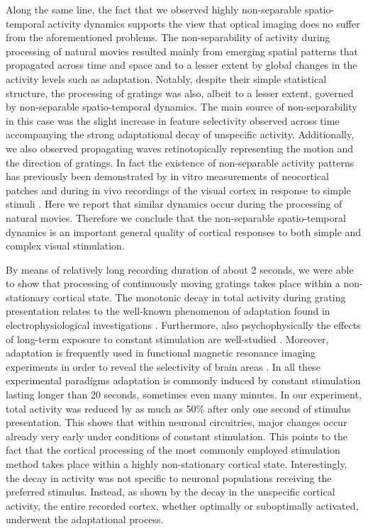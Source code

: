 Along the same line, the fact that we observed highly non-separable
spatio-temporal activity dynamics supports the view that optical imaging
does no suffer from the aforementioned problems. The non-separability of
activity during processing of natural movies resulted mainly from emerging
spatial patterns that propagated across time and space and to a lesser
extent by global changes in the activity levels such as adaptation.
Notably, despite their simple statistical structure, the processing of
gratings was also, albeit to a lesser extent, governed by non-separable
spatio-temporal dynamics. The main source of non-separability in this case
was the slight increase in feature selectivity observed across time
accompanying the strong adaptational decay of unspecific activity.
Additionally, we also observed propagating waves retinotopically
representing the motion and the direction of gratings. In fact the
existence of non-separable activity patterns has previously been
demonstrated by in vitro measurements of neocortical patches
\citep{xu2007a} and during in vivo recordings of the visual cortex in
response to simple stimuli \citep{prechtl1997a,benucci2007a}. Here we
report that similar dynamics occur during the processing of natural movies.
Therefore we conclude that the non-separable spatio-temporal dynamics is an
important general quality of cortical responses to both simple and complex
visual stimulation.

By means of relatively long recording duration of about 2 seconds, we were
able to show that processing of continuously moving gratings takes place
within a non-stationary cortical state. The monotonic decay in total
activity during grating presentation relates to the well-known phenomenon
of adaptation found in electrophysiological investigations
\citep{maffei1973a, vautin1977a, movshon1979a, ohzawa1982a, kohn2003a}.
Furthermore, also psychophysically the effects of long-term exposure to
constant stimulation are well-studied \citep{gibson1937a, blakemore1969a,
pestilli2007a}. Moreover, adaptation is frequently used in functional
magnetic resonance imaging experiments in order to reveal the selectivity
of brain areas \citep{krekelberg2006a}. In all these experimental paradigms
adaptation is commonly induced by constant stimulation lasting longer than
20 seconds, sometimes even many minutes. In our experiment, total activity
was reduced by as much as 50\% after only one second of stimulus
presentation. This shows that within neuronal circuitries, major changes
occur already very early under conditions of constant stimulation. This
points to the fact that the cortical processing of the most commonly
employed stimulation method takes place within a highly non-stationary
cortical state. Interestingly, the decay in activity was not specific to
neuronal populations receiving the preferred stimulus. Instead, as shown by
the decay in the unspecific cortical activity, the entire recorded cortex,
whether optimally or suboptimally activated, underwent the adaptational
process.

